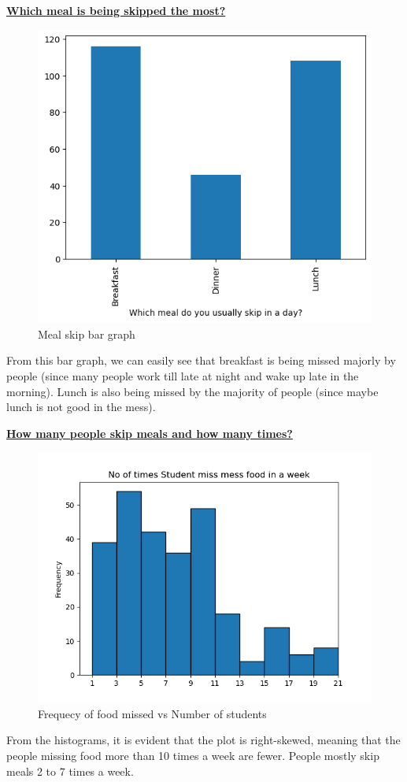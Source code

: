 \documentclass{article}
\begin{document}
\centerline{\underline{\bfseries{Which meal is being skipped the most?}}}
\begin{figure}[H]
    \centering
    \includegraphics[scale = 0.7]{bar_timing_skip.png}
    \caption{Meal skip bar graph}
    \label{fig:Normality}
\end{figure}
From this bar graph, we can easily see that breakfast is being missed majorly by people (since many people work till late at night and wake up late in the morning). Lunch is also being missed by the majority of people (since maybe lunch is not good in the mess).\\

\pagebreak
\centerline{\underline{\bfseries{How many people skip meals and how many times?}}}
\begin{figure}[H]
    \centering
    \includegraphics[scale = 0.7]{histogram_meal_skip.png}
    \caption{Frequecy of food missed vs Number of students}  
    \label{Normality_plot}
\end{figure}
From the histograms, it is evident that the plot is right-skewed, meaning that the people missing food more than 10 times a week are fewer. People mostly skip meals 2 to 7 times a week.
\end{document}
